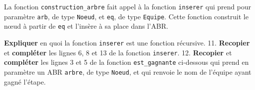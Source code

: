 \begin{Shaded}
\begin{Highlighting}[]
 
\OperatorTok{=}\NormalTok{ Noeud(liste[}\NormalTok{])}
    \NormalTok{(}\NormalTok{,}
   
\end{Highlighting}
\end{Shaded}

La fonction \texttt{construction\_arbre} fait appel à la fonction
\texttt{inserer} qui prend pour paramètre \texttt{arb}, de type
\texttt{Noeud}, et \texttt{eq}, de type \texttt{Equipe}. Cette fonction
construit le nœud à partir de \texttt{eq} et l'insère à sa place dans
l'ABR.

\begin{Shaded}
\begin{Highlighting}[]
 
   
   \OperatorTok{\textless{}}
        \NormalTok{:}
\OperatorTok{=}
       \NormalTok{:}
   \NormalTok{:}
       \NormalTok{:}
\OperatorTok{=}
      \NormalTok{:}
\end{Highlighting}
\end{Shaded}

\textbf{Expliquer} en quoi la fonction \texttt{inserer} est une fonction
récursive. 11. \textbf{Recopier} et \textbf{compléter} les lignes 6, 8
et 13 de la fonction \texttt{inserer}. 12. \textbf{Recopier} et
\textbf{compléter} les lignes 3 et 5 de la fonction
\texttt{est\_gagnante} ci-dessous qui prend en paramètre un ABR
\texttt{arbre}, de type \texttt{Noeud}, et qui renvoie le nom de
l'équipe ayant gagné l'étape.

